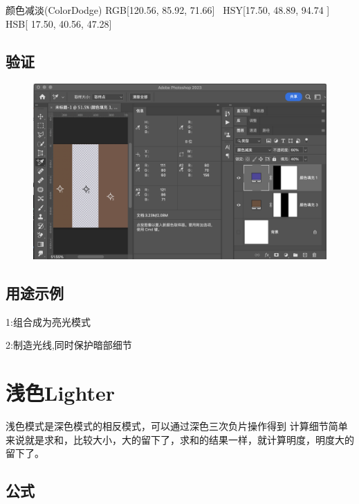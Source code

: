 \begin{result}
\item 颜色减淡(ColorDodge)    RGB[120.56,  85.92,  71.66]~ HSY[17.50,  48.89,  94.74 ]~ HSB[ 17.50,  40.56,  47.28]
\end{result}

\subsection{ 验证}
\begin{figure}[h!]
	\centering
	\includegraphics[width=\linewidth]{figure/colordodge}
	\caption{}
	\label{fig:colordodge}
\end{figure}


\subsection{ 用途示例}

1:组合成为亮光模式

2:制造光线,同时保护暗部细节

\newpage
\section{ 浅色Lighter}

浅色模式是深色模式的相反模式，可以通过深色三次负片操作得到
计算细节简单来说就是求和，比较大小，大的留下了，求和的结果一样，就计算明度，明度大的留下了。

\subsection{ 公式}

